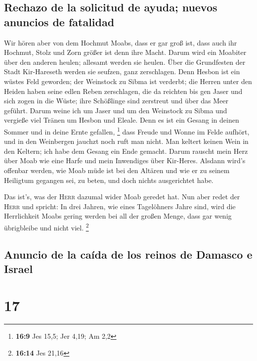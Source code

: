 \hypertarget{rechazo-de-la-solicitud-de-ayuda-nuevos-anuncios-de-fatalidad}{%
\subsection{Rechazo de la solicitud de ayuda; nuevos anuncios de
fatalidad}\label{rechazo-de-la-solicitud-de-ayuda-nuevos-anuncios-de-fatalidad}}

 Wir hören aber von dem Hochmut Moabs, dass er gar groß
ist, dass auch ihr Hochmut, Stolz und Zorn größer ist denn ihre Macht.
 Darum wird ein Moabiter über den anderen heulen; allesamt
werden sie heulen. Über die Grundfesten der Stadt Kir-Hareseth werden
sie seufzen, ganz zerschlagen.  Denn Hesbon ist ein wüstes
Feld geworden; der Weinstock zu Sibma ist verderbt; die Herren unter den
Heiden haben seine edlen Reben zerschlagen, die da reichten bis gen
Jaser und sich zogen in die Wüste; ihre Schößlinge sind zerstreut und
über das Meer geführt.  Darum weine ich um Jaser und um
den Weinstock zu Sibma und vergieße viel Tränen um Hesbon und Eleale.
Denn es ist ein Gesang in deinen Sommer und in deine Ernte gefallen,
\footnote{\textbf{16:9} Jes 15,5; Jer 4,19; Am 2,2}  dass
Freude und Wonne im Felde aufhört, und in den Weinbergen jauchzt noch
ruft man nicht. Man keltert keinen Wein in den Keltern; ich habe dem
Gesang ein Ende gemacht.  Darum rauscht mein Herz über
Moab wie eine Harfe und mein Inwendiges über Kir-Heres. 
Alsdann wird's offenbar werden, wie Moab müde ist bei den Altären und
wie er zu seinem Heiligtum gegangen sei, zu beten, und doch nichts
ausgerichtet habe.

 Das ist's, was der \textsc{Herr} dazumal wider Moab
geredet hat.  Nun aber redet der \textsc{Herr} und
spricht: In drei Jahren, wie eines Tagelöhners Jahre sind, wird die
Herrlichkeit Moabs gering werden bei all der großen Menge, dass gar
wenig übrigbleibe und nicht viel. \footnote{\textbf{16:14} Jes 21,16}

\hypertarget{anuncio-de-la-cauxedda-de-los-reinos-de-damasco-e-israel}{%
\subsection{Anuncio de la caída de los reinos de Damasco e
Israel}\label{anuncio-de-la-cauxedda-de-los-reinos-de-damasco-e-israel}}

\hypertarget{section-16}{%
\section{17}\label{section-16}}

